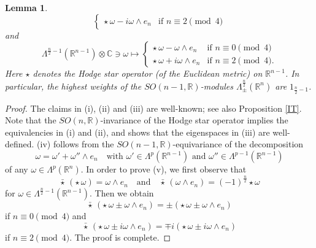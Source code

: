 \documentclass[a4paper,12pt,reqno]{amsart}
\newtheorem{lem}[theorem]{Lemma}
\numberwithin{theorem}{subsection}
\numberwithin{equation}{section}
\begin{document}
\begin{lem}
$$\begin{cases}
   \star \, \omega - i \omega \wedge e_n & \mbox{if  } n \equiv  2 \!\! \pmod{4}
   \end{cases}
$$
and
$$
   \Lambda^{\frac{n}{2}-1}({\mathbb{R}}^{n-1}) \otimes {\mathbb{C}} \ni \omega \mapsto
   \begin{cases} \star \, \omega - \omega \wedge e_n & \mbox{if  } n \equiv 0 \!\! \pmod{4} \\
   \star \, \omega + i \omega \wedge e_n & \mbox{if  } n \equiv  2 \!\! \pmod{4}.
   \end{cases}
$$
Here $\star$ denotes the Hodge star operator (of the Euclidean metric) on
${\mathbb{R}}^{n-1}$. In particular, the highest weights of the $SO(n\!-\!1,{\mathbb{R}})$-modules
$\Lambda_\pm^{\frac{n}{2}}({\mathbb{R}}^n)$ are $1_{\frac{n}{2}-1}$.
\end{lem}

\begin{proof} The claims in (i), (ii) and (iii) are well-known; see also Proposition \ref{IT}.
Note that the $SO(n,{\mathbb{R}})$-invariance of the Hodge star operator implies the
equivalencies in (i) and (ii), and shows that the eigenspaces in (iii) are
well-defined. (iv) follows from the $SO(n\!-\!1,{\mathbb{R}})$-equivariance of the
decomposition
$$
   \omega = \omega' + \omega'' \wedge e_n \quad \mbox{with $\omega' \in
   \Lambda^p({\mathbb{R}}^{n-1})$ and $\omega'' \in \Lambda^{p-1}({\mathbb{R}}^{n-1})$}
$$
of any $\omega \in \Lambda^p({\mathbb{R}}^n)$. In order to prove (v), we first observe
that
$$
   \bar{\star} \, (\star \,\omega) = \omega \wedge e_n \quad \mbox{and} \quad  \bar{\star} \, (\omega \wedge e_n)
   = (-1)^{\frac{n}{2}} \star \omega
$$
for $\omega \in \Lambda^{\frac{n}{2}-1}({\mathbb{R}}^{n-1})$. Then we obtain
$$
   \bar{\star} \, (\star \, \omega \pm \omega \wedge e_n) = \pm (\star \,\omega \pm \omega \wedge e_n)
$$
if $n \equiv 0 \pmod{4}$ and
$$
   \bar{\star} \, (\star \, \omega \pm i \omega \wedge e_n) = \mp i (\star \,\omega \pm i \omega \wedge e_n)
$$
if $n \equiv 2 \pmod{4}$. The proof is complete.
\end{proof}
\end{document}
